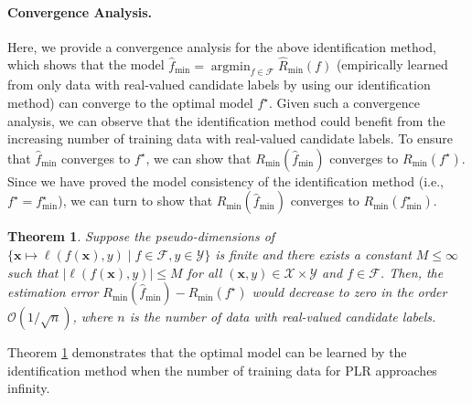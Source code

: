 \documentclass[letterpaper]{article} %
\newtheorem{thm}{Theorem}
\newcommand{\argmin}{\mathop{\arg\min}}
\begin{document}
\paragraph{Convergence Analysis.} Here, we provide a convergence analysis for the above identification method, which shows that the model $\widehat{f}_{\mathrm{min}}=\argmin_{f\in\mathcal{F}}\widehat{R}_{\mathrm{min}}(f)$ (empirically learned from only data with real-valued candidate labels by using our identification method) can converge to the optimal model $f^\star$. Given such a convergence analysis, we can observe that the identification method could benefit from the increasing number of training data with real-valued candidate labels. To ensure that $\widehat{f}_{\mathrm{min}}$ converges to $f^\star$, we can show that $R_{\mathrm{min}}(\widehat{f}_{\mathrm{min}})$ converges to $R_{\mathrm{min}}(f^\star)$. Since we have proved the model consistency of the identification method (i.e., $f^\star=f^\star_{\mathrm{min}}$), we can turn to show that $R_{\mathrm{min}}(\widehat{f}_{\mathrm{min}})$ converges to $R_{\mathrm{min}}(f^\star_{\mathrm{min}})$.
\begin{thm}
\label{thm2}
Suppose the pseudo-dimensions of $\{\bm{x}\mapsto \ell(f(\bm{x}),y)\mid f\in\mathcal{F}, y\in\mathcal{Y}\}$ is finite and there exists a constant $M\leq\infty$ such that $|\ell(f(\bm{x}),y)|\leq M$ for all $(\bm{x},y)\in\mathcal{X}\times\mathcal{Y}$ and $f\in\mathcal{F}$. Then, the estimation error $R_{\mathrm{min}}(\widehat{f}_{\mathrm{min}})-R_{\mathrm{min}}(f^\star)$ would decrease to zero in the order $\mathcal{O}({1}/{\sqrt{n}})$, where $n$ is the number of data with real-valued candidate labels.
\end{thm}
Theorem \ref{thm2} demonstrates that the optimal model can be learned by the identification method when the number of training data for PLR approaches infinity. %
\end{document}
